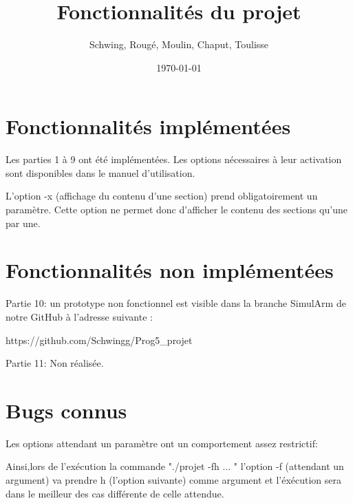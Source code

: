\documentclass[12pt, a4paper]{article}
\title{Fonctionnalités du projet}
\author{Schwing, Roug\'e, Moulin, Chaput, Toulisse}
\date{\today}
\begin{document}
\maketitle

\section{Fonctionnalités implémentées}

Les parties 1 à 9 ont été implémentées.
Les options nécessaires à leur activation sont disponibles dans le manuel d'utilisation.


L'option -x (affichage du contenu d'une section) prend obligatoirement un paramètre.
Cette option ne permet donc d'afficher le contenu des sections qu'une par une.


\section{Fonctionnalités non implémentées}

Partie 10: un prototype non fonctionnel est visible dans la branche SimulArm de notre GitHub à l'adresse suivante :

https://github.com/Schwingg/Prog5\_projet


Partie 11: Non réalisée.


\section{Bugs connus}

Les options attendant un paramètre ont un comportement assez restrictif:

Ainsi,lors de l'exécution la commande "./projet -fh ... " l'option -f (attendant un argument) va prendre h (l'option suivante) comme argument et l'éxécution sera dans le meilleur des cas différente de celle attendue.
\end{document}
